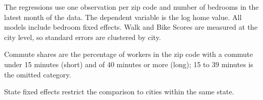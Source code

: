 \documentclass[11pt,a4paper]{article}
\begin{document}
\FloatBarrier
\newpage
The regressions use one observation per zip code and number of bedrooms in the latest month of the data. The dependent variable is the log home value. All models include bedroom fixed effects. Walk and Bike Scores are measured at the city level, so standard errors are clustered by city.



\FloatBarrier
Commute shares are the percentage of workers in the zip code with a commute under 15 minutes (short) and of 40 minutes or more (long); 15 to 39 minutes is the omitted category.



\FloatBarrier
State fixed effects restrict the comparison to cities within the same state.


\end{document}
